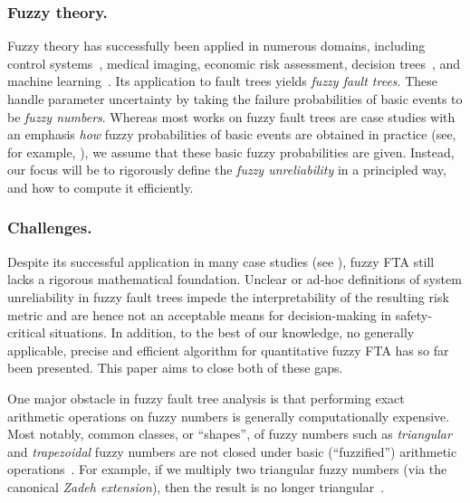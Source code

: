 \documentclass[runningheads]{llncs}
\renewcommand{\emph}[1]{{\it #1}}
\begin{document}
%

\subsubsection{Fuzzy theory.}\label{par:fuzzy_theory_explanation} 
Fuzzy theory has successfully been applied in numerous domains, 
including control systems~\cite{deBarros2017afirst}, medical imaging, economic risk assessment, decision trees~\cite{Basiura2015advances}, and machine learning~\cite{couso2019fuzzy}. 
Its application to fault trees yields \emph{fuzzy fault trees}.
These handle parameter uncertainty by taking the failure probabilities of basic events to be \emph{fuzzy numbers}.  
Whereas most works on fuzzy fault trees are case studies with an emphasis \emph{how} fuzzy probabilities of basic events are obtained in practice (see, for example, \cite{yazdi2019uncertainty}), we assume that these basic fuzzy probabilities are given. 
Instead, our focus will be to rigorously define the \emph{fuzzy unreliability} in a principled way, and how to compute it efficiently. 



\subsubsection{Challenges.}\label{par:challenges}
Despite its successful application in many case studies (see ), fuzzy FTA still lacks a rigorous mathematical foundation. Unclear or ad-hoc definitions of system unreliability in fuzzy fault trees impede the interpretability of the resulting risk metric and are hence not an acceptable means for decision-making in safety-critical situations.
In addition, to the best of our knowledge, no generally applicable, precise and efficient algorithm for quantitative fuzzy FTA has so far been presented. 
This paper aims to close both of these gaps.

One major obstacle in fuzzy fault tree analysis is that performing exact arithmetic operations on fuzzy numbers is generally computationally expensive.
Most notably, common classes, or ``shapes'', of fuzzy numbers such as \emph{triangular} and \emph{trapezoidal} fuzzy numbers are not closed under basic (``fuzzified'') arithmetic operations~\cite{tanaka1983fault,Liang1993FFTA,Basiura2015advances}.
For example, 
if we multiply two triangular fuzzy numbers
(via the canonical \emph{Zadeh extension}), then the result is no longer triangular~\cite{Liang1993FFTA}. 
\end{document}
